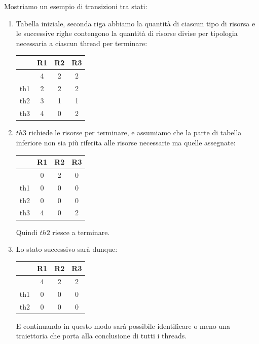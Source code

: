 \documentclass{article}
\begin{document}
Mostriamo un esempio di transizioni tra stati:

\begin{enumerate}
    \item Tabella iniziale, seconda riga abbiamo la quantità di ciascun tipo di risorsa e le successive righe contengono la quantità di risorse divise per tipologia
    necessaria a ciascun thread per terminare:
    \vspace*{8px}
    \begin{center}
        \begin{tabular}{ |c|c|c|c| } 
         \hline
             & R1 & R2 & R3 \\ 
         \hline
             & 4 & 2 & 2 \\ 
         \hline
         th1 & 2 & 2 & 2 \\ 
         th2 & 3 & 1 & 1 \\ 
         th3 & 4 & 0 & 2 \\
         \hline
        \end{tabular}
    \end{center}
    \vspace*{8px}
    \item $th3$ richiede le risorse per terminare, e assumiamo che la parte di tabella inferiore non sia più
    riferita alle risorse necessarie ma quelle assegnate:
    \vspace*{8px}
    \begin{center}
        \begin{tabular}{ |c|c|c|c| } 
         \hline
             & R1 & R2 & R3 \\ 
         \hline
             & 0 & 2 & 0 \\ 
         \hline
         th1 & 0 & 0 & 0 \\ 
         th2 & 0 & 0 & 0 \\ 
         th3 & 4 & 0 & 2 \\
         \hline
        \end{tabular}
    \end{center}
    \vspace*{8px}
    Quindi $th2$ riesce a terminare.
    \item Lo stato successivo sarà dunque:
    \vspace*{8px}
    \begin{center}
        \begin{tabular}{ |c|c|c|c| } 
         \hline
             & R1 & R2 & R3 \\ 
         \hline
             & 4 & 2 & 2 \\ 
         \hline
         th1 & 0 & 0 & 0 \\ 
         th2 & 0 & 0 & 0 \\ 
         \hline
        \end{tabular}
    \end{center}
    \vspace*{8px}
    E continuando in questo modo sarà possibile identificare o meno una traiettoria che porta alla conclusione di tutti i threads.
\end{enumerate}
\end{document}
